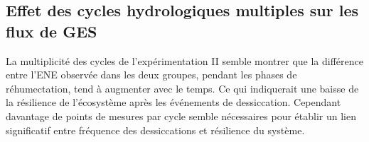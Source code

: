 %
%
%
%
%
%
%

\subsection{Effet des cycles hydrologiques multiples sur les flux de GES}

La multiplicité des cycles de l'expérimentation II semble montrer que la différence entre l'ENE observée dans les deux groupes, pendant les phases de réhumectation, tend à augmenter avec le temps.
Ce qui indiquerait une baisse de la résilience de l'écosystème après les événements de dessiccation.
Cependant davantage de points de mesures par cycle semble nécessaires pour établir un lien significatif entre fréquence des dessiccations et résilience du système.


